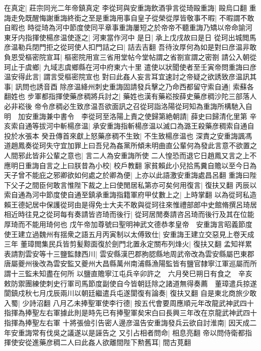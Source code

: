 在真定|{
	莊宗同光二年帝鎮真定}
李從珂與安重誨飲酒爭言從琦毆重誨|{
	毆烏口翻}
重誨走免既醒悔謝重誨終銜之至是重誨用事自皇子從榮從厚皆敬事不暇|{
	不暇謂不敢自暇也}
時從琦為河中節度使同平章事重誨屢短之於帝帝不聽重誨乃矯以帝命諭河東牙内指揮使楊彦温使逐之|{
	河東當作河中}
是日|{
	承上戊戌故曰是日}
從珂出城閲馬彦温勒兵閉門拒之從珂使人扣門詰之曰|{
	詰去吉翻}
吾待汝厚何為如是對曰彦温非敢負恩受樞密院宣耳|{
	樞密院用宣三省用堂帖今堂帖謂之省劄宣謂之密劄}
請公入朝從珂止于虞鄉|{
	九域志虞鄉縣在河中府東六十里}
遣使以狀聞使者至壬寅帝問重誨曰彦温安得此言|{
	謂言受樞密院宣也}
對曰此姦人妄言耳宜速討之帝疑之欲誘致彦温訊其事|{
	訊問也誘音酉}
除彦温絳州刺史重誨固請發兵擊之乃命西都留守索自通|{
	索蘇各翻姓也}
步軍都指揮使藥彦稠將兵討之|{
	藥姓也漢有藥崧按薛史藥彦稠沙陀三部落人必非崧後}
帝令彦稠必生致彦温吾欲面訊之召從珂詣洛陽從珂知為重誨所構馳入自明　加安重誨兼中書令　李從珂至洛陽上責之使歸第絶朝請|{
	薛史曰歸清化里第}
辛亥索自通等拔河中斬楊彦温|{
	承安重誨指斬楊彦温以滅口為潞王殺藥彦稠索自通自投於水張本}
癸丑傳首來獻上怒藥彦稠不生致|{
	不生致楊彦温也}
深責之安重誨諷馮道趙鳳奏從珂失守宜加罪上曰吾兒為姦黨所傾未明曲直公輩何為發此言意不欲置之人間邪此皆非公輩之意也|{
	言二人為安重誨所使}
二人惶恐而退它日趙鳳又言之上不應明日重誨自言之上曰朕昔為小校|{
	校戶教翻}
家貧賴此小兒拾馬糞自贍以至今日為天子曾不能庇之邪卿欲如何處之於卿為便|{
	上亦以此語激安重誨處昌呂翻}
重誨曰陛下父子之間臣何敢言惟陛下裁之上曰使閒居私第亦可矣何用復言|{
	復扶又翻}
丙辰以索自通為河中節度使自通至鎮承重誨指籍軍府甲仗數上之|{
	上時掌翻}
以為從珂私造賴王德妃居中保護從珂由是得免士大夫不敢與從珂往來惟禮部郎中史館脩撰呂琦居相近時往見之從珂每有奏請皆咨琦而後行|{
	從珂居閒奏請咨呂琦而後行及其在位能厚琦而不能用琦何也}
戊午帝加尊號曰聖明神武文德恭孝皇帝　安重誨言昭義節度使王建立過魏州有揺衆之語五月丙寅制以太傅致仕|{
	安重誨王建立交惡見上卷天成三年}
董璋閲集民兵皆剪髪黥面復於劍門北置永定關布列烽火|{
	復扶又翻}
孟知祥累表請割雲安等十三鹽監隸西川|{
	雲安縣漢巴郡胊䏰縣地周武帝改為雲安縣屬巴東郡唐屬夔州後改為雲安監又夔州大昌縣萬州南浦縣漁陽監皆有鹽官隸寧江軍巡屬而所謂十三監未知盡在何所}
以鹽直贍寧江屯兵辛卯許之　六月癸巳朔日有食之　辛亥敕防禦團練使刺史行軍司馬節度副使自今皆朝廷除之諸道無得奏薦　董璋遣兵掠遂閬鎮戍秋七月戊辰兩川以朝廷繼遣兵屯遂閬復有論奏|{
	復扶又翻}
自是東北商旅少敢入蜀|{
	少詩沼翻}
八月乙未捧聖軍使李行德|{
	按五代會要周應順元年改龍武神武四十指揮為捧聖左右軍據此則是時先已有捧聖軍矣宋白曰長興三年改在京龍武神武四十指揮為捧聖左右軍}
十將張儉引告密人邊彦温告安重誨發兵云欲自討淮南|{
	因天成二年安重誨常有伐吳之議遂以是誣告之}
又引占相者問命|{
	相息亮翻}
帝以問侍衛都指揮使安從進藥彦稠二人曰此姦人欲離間陛下勲舊耳|{
	間古莧翻}
